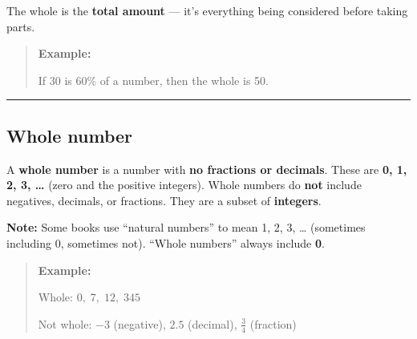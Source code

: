 \documentclass[
  letterpaper,
  DIV=11,
  numbers=noendperiod]{scrreprt}
\begin{document}
The whole is the \textbf{total amount} --- it's everything being
considered before taking parts.

\begin{quote}
\textbf{Example:}

If 30 is 60\% of a number, then the whole is 50.
\end{quote}

\begin{center}\rule{0.5\linewidth}{0.5pt}\end{center}

\subsection*{Whole number}\label{glossary-whole-number}

A \textbf{whole number} is a number with \textbf{no fractions or
decimals}. These are \textbf{0, 1, 2, 3, \ldots{}} (zero and the
positive integers). Whole numbers do \textbf{not} include negatives,
decimals, or fractions. They are a subset of \textbf{integers}.

\textbf{Note:} Some books use ``natural numbers'' to mean 1, 2, 3,
\ldots{} (sometimes including 0, sometimes not). ``Whole numbers''
always include \textbf{0}.

\begin{quote}
\textbf{Example:}

Whole: \(0,\; 7,\; 12,\; 345\)

Not whole: \(-3\) (negative), \(2.5\) (decimal), \(\tfrac{3}{4}\)
(fraction)
\end{quote}
\end{document}
